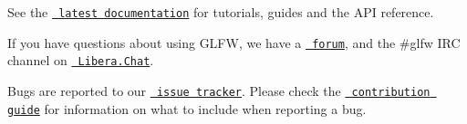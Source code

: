 See the \href{https://www.glfw.org/docs/latest/}{\texttt{ latest documentation}} for tutorials, guides and the A\+PI reference.

If you have questions about using G\+L\+FW, we have a \href{https://discourse.glfw.org/}{\texttt{ forum}}, and the {\ttfamily \#glfw} I\+RC channel on \href{https://libera.chat/}{\texttt{ Libera.\+Chat}}.

Bugs are reported to our \href{https://github.com/glfw/glfw/issues}{\texttt{ issue tracker}}. Please check the \href{https://github.com/glfw/glfw/blob/master/docs/CONTRIBUTING.md}{\texttt{ contribution guide}} for information on what to include when reporting a bug. 